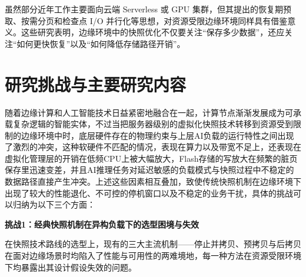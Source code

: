 虽然部分近年工作主要面向云端 Serverless 或 GPU 集群，但其提出的恢复期预取、按需分页和检查点 I/O 并行化等思想，对资源受限边缘环境同样具有借鉴意义\cite{sabre2024, pass2024, fastpersist2024}。这些研究表明，边缘环境中的快照优化不仅要关注“保存多少数据”，还应关注“如何更快恢复”以及“如何降低存储路径开销”。

\section{研究挑战与主要研究内容}

随着边缘计算和人工智能技术日益紧密地融合在一起，计算节点渐渐发展成为可承载复杂逻辑的智能实体，不过当把服务器级别的虚拟化快照技术转移到资源受到限制的边缘环境中时，底层硬件存在的物理约束与上层AI负载的运行特性之间出现了激烈的冲突，这种软硬件不匹配的情况，表现在算力以及带宽不足上，还表现在虚拟化管理层的开销在低频CPU上被大幅放大，Flash存储的写放大在频繁的脏页保存里迅速变差，并且AI推理任务对延迟敏感的负载模式与快照过程中不稳定的数据路径直接产生冲突。上述这些因素相互叠加，致使传统快照机制在边缘环境下出现了较大的性能退化、不可控的停机窗口以及不稳定的业务干扰，具体的挑战可以归纳为以下三个方面：

\textbf{挑战1：经典快照机制在异构负载下的选型困境与失效}

在快照技术路线的选型上，现有的三大主流机制——停止并拷贝、预拷贝与后拷贝在面对边缘场景时均陷入了性能与可用性的两难境地，每一种方法在资源受限环境下均暴露出其设计假设失效的问题。

